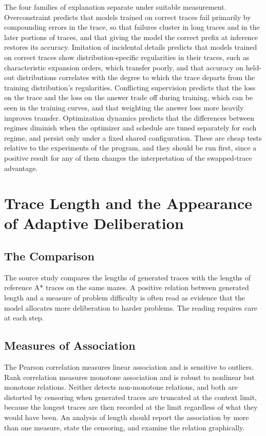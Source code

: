 The four families of explanation separate under suitable measurement. Overconstraint predicts that models trained on correct traces fail primarily by compounding errors in the trace, so that failures cluster in long traces and in the later portions of traces, and that giving the model the correct prefix at inference restores its accuracy. Imitation of incidental details predicts that models trained on correct traces show distribution-specific regularities in their traces, such as characteristic expansion orders, which transfer poorly, and that accuracy on held-out distributions correlates with the degree to which the trace departs from the training distribution's regularities. Conflicting supervision predicts that the loss on the trace and the loss on the answer trade off during training, which can be seen in the training curves, and that weighting the answer loss more heavily improves transfer. Optimization dynamics predicts that the differences between regimes diminish when the optimizer and schedule are tuned separately for each regime, and persist only under a fixed shared configuration. These are cheap tests relative to the experiments of the program, and they should be run first, since a positive result for any of them changes the interpretation of the swapped-trace advantage.

\chapter{Trace Length and the Appearance of Adaptive Deliberation}
\label{ch:length}

\section{The Comparison}

The source study compares the lengths of generated traces with the lengths of reference A* traces on the same mazes. A positive relation between generated length and a measure of problem difficulty is often read as evidence that the model allocates more deliberation to harder problems. The reading requires care at each step.

\section{Measures of Association}

The Pearson correlation measures linear association and is sensitive to outliers. Rank correlation measures monotone association and is robust to nonlinear but monotone relations. Neither detects non-monotone relations, and both are distorted by censoring when generated traces are truncated at the context limit, because the longest traces are then recorded at the limit regardless of what they would have been. An analysis of length should report the association by more than one measure, state the censoring, and examine the relation graphically.

